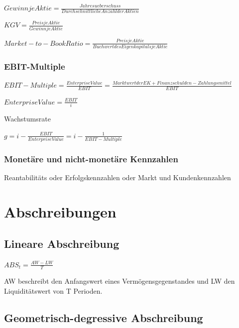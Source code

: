 \documentclass{article}
\begin{document}
\begin{center}
$Gewinn je Aktie = \frac{Jahresueberschuss}{Durchschnittliche Anzahl der Aktien}$
\end{center}
\begin{center}
$KGV = \frac{Preis je Aktie}{Gewinn je Aktie}$
\end{center}
\begin{center}
$Market-to-Book Ratio = \frac{Preis je Aktie}{Buchwert des Eigenkapitals je Aktie}$ 
\end{center}
\subsubsection{EBIT-Multiple}

\begin{center}
$EBIT-Multiple = \frac{Enterprise Value}{EBIT} = \frac{Marktwert der EK + Finanzschulden - Zahlungsmittel}
{EBIT}$
\end{center}
\begin{center}
$ Enterprise Value = \frac{EBIT}{i}$
\end{center}
Wachstumsrate \begin{center}
$g = i - \frac{EBIT}{Enterprise Value} = i - \frac{1}{EBIT-Multiple}$
\end{center}

\subsubsection{Monetäre und nicht-monetäre Kennzahlen}
Reantabilitäts oder Erfolgskennzahlen oder Markt und Kundenkennzahlen

\section{Abschreibungen}
\subsection{Lineare Abschreibung}
\begin{center}
$ ABS_t = \frac{AW - LW}{T} $
\end{center}

AW beschreibt den Anfangswert eines Vermögensgegenstandes und LW den Liquiditätswert von T Perioden.

\subsection{Geometrisch-degressive Abschreibung}
\end{document}
